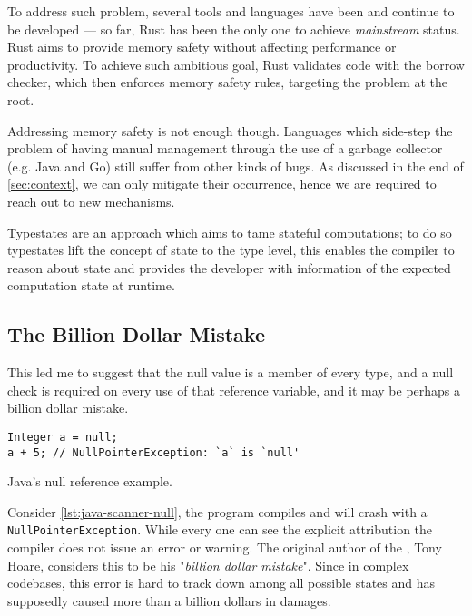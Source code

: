 To address such problem, several tools and languages have been and continue to be developed ---
so far, Rust has been the only one to achieve \emph{mainstream} status.
Rust aims to provide memory safety without affecting performance or productivity.
To achieve such ambitious goal, Rust validates code with the borrow checker, which then enforces memory safety rules,
targeting the problem at the root.

Addressing memory safety is not enough though.
Languages which side-step the problem of having manual management
through the use of a garbage collector (e.g. Java and Go) still suffer from other kinds of bugs.
As discussed in the end of \autoref{sec:context}, we can only mitigate their occurrence,
hence we are required to reach out to new mechanisms.

Typestates are an approach which aims to tame stateful computations;
to do so typestates lift the concept of state to the type level,
this enables the compiler to reason about state and provides the developer
with information of the expected computation state at runtime.

\subsection{The Billion Dollar Mistake}

\begin{displayquote}
    This led me to suggest that the null value is a member of every type,
    and a null check is required on every use of that reference variable,
    and it may be perhaps a billion dollar mistake.
\end{displayquote}

\begin{listing}
    \begin{verbatim}
Integer a = null;
a + 5; // NullPointerException: `a` is `null'
    \end{verbatim}
    \caption{Java's null reference example.}
    \label{lst:java-scanner-null}
\end{listing}

Consider \autoref{lst:java-scanner-null}, the program compiles and will crash with a \texttt{NullPointerException}.
While every one can see the explicit  attribution the compiler does not issue an error or warning.
The original author of the , Tony Hoare, considers this to be his "\emph{billion dollar mistake}".
Since in complex codebases, this error is hard to track down among all possible states and
has supposedly caused more than a billion dollars in damages.


